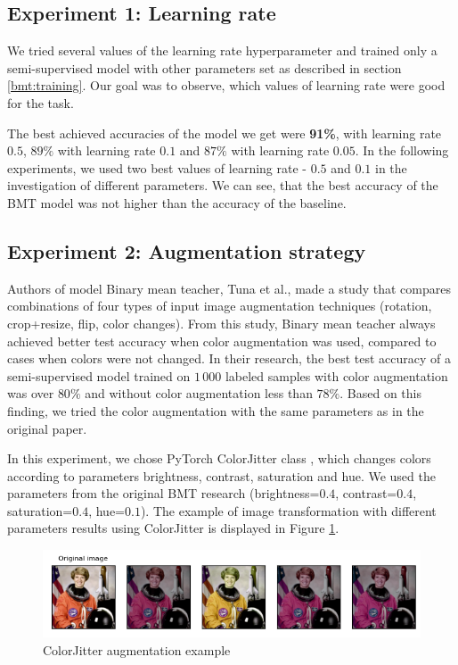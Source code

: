 \subsection{Experiment 1: Learning rate}
We tried several values of the learning rate hyperparameter and trained only a semi-supervised model with other parameters set as described in section \ref{bmt:training}. Our goal was to observe, which values of learning rate were good for the task. 

The best achieved accuracies of the model we get were \textbf{91\%}, with learning rate $0.5$, $89\%$ with learning rate $0.1$ and $87\%$ with learning rate $0.05$.  In the following experiments, we used two best values of learning rate - $0.5$ and $0.1$ in the investigation of different parameters. We can see, that the best accuracy of the BMT model was not higher than the accuracy of the baseline.

\subsection{Experiment 2: Augmentation strategy}

Authors of model Binary mean teacher, Tuna et al.\cite{tuna-bmt}, made a study that compares combinations of four types of input image augmentation techniques (rotation, crop+resize, flip, color changes). From this study, Binary mean teacher always achieved better test accuracy when color augmentation was used, compared to cases when colors were not changed. In their research, the best test accuracy of a semi-supervised model trained on $1\,000$ labeled samples with color augmentation was over $80\%$ and without color augmentation less than $78\%$. Based on this finding, we tried the color augmentation with the same parameters as in the original paper.

In this experiment, we chose PyTorch ColorJitter class \cite{colorjitter}, which changes colors according to parameters brightness, contrast, saturation and hue. We used the parameters from the original BMT research (brightness=$0.4$, contrast=$0.4$, saturation=$0.4$, hue=$0.1$). The example of image transformation with different parameters results using ColorJitter is displayed in Figure \ref{jitter}.

\begin{figure}[!h]
    \centering
    \includegraphics[width=1\textwidth]{figs/jitter.png}
    \caption{ColorJitter augmentation example \cite{colorjitter}}
    \label{jitter}
\end{figure}

